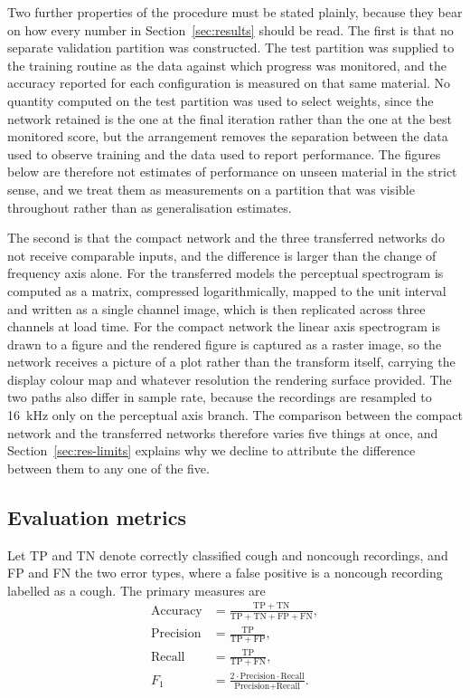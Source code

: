 Two further properties of the procedure must be stated plainly, because they
bear on how every number in Section~\ref{sec:results} should be read. The
first is that no separate validation partition was constructed. The test
partition was supplied to the training routine as the data against which
progress was monitored, and the accuracy reported for each configuration is
measured on that same material. No quantity computed on the test partition
was used to select weights, since the network retained is the one at the final
iteration rather than the one at the best monitored score, but the
arrangement removes the separation between the data used to observe training
and the data used to report performance. The figures below are therefore not
estimates of performance on unseen material in the strict sense, and we treat
them as measurements on a partition that was visible throughout rather than as
generalisation estimates.

The second is that the compact network and the three transferred networks do
not receive comparable inputs, and the difference is larger than the change of
frequency axis alone. For the transferred models the perceptual spectrogram is
computed as a matrix, compressed logarithmically, mapped to the unit interval
and written as a single channel image, which is then replicated across three
channels at load time. For the compact network the linear axis spectrogram is
drawn to a figure and the rendered figure is captured as a raster image, so
the network receives a picture of a plot rather than the transform itself,
carrying the display colour map and whatever resolution the rendering surface
provided. The two paths also differ in sample rate, because the recordings are
resampled to 16~kHz only on the perceptual axis branch. The comparison between
the compact network and the transferred networks therefore varies five things
at once, and Section~\ref{sec:res-limits} explains why we decline to attribute
the difference between them to any one of the five.

\subsection{Evaluation metrics}\label{sec:s-metrics}

Let TP and TN denote correctly classified cough and noncough recordings, and
FP and FN the two error types, where a false positive is a noncough recording
labelled as a cough. The primary measures are
\begin{align}
\text{Accuracy} &= \frac{\mathrm{TP} + \mathrm{TN}}
{\mathrm{TP} + \mathrm{TN} + \mathrm{FP} + \mathrm{FN}}, \label{eq:acc} \\[4pt]
\text{Precision} &= \frac{\mathrm{TP}}{\mathrm{TP} + \mathrm{FP}},
\label{eq:prec} \\[4pt]
\text{Recall} &= \frac{\mathrm{TP}}{\mathrm{TP} + \mathrm{FN}},
\label{eq:rec} \\[4pt]
F_1 &= \frac{2 \cdot \text{Precision} \cdot \text{Recall}}
{\text{Precision} + \text{Recall}}. \label{eq:f1}
\end{align}

